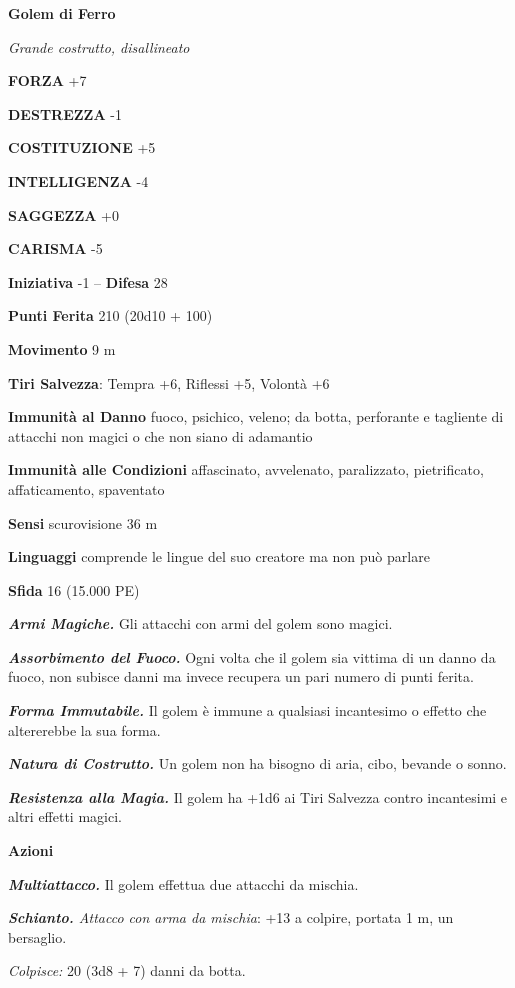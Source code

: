 \begin{multicols}{2}
\medskip{}\textbf{Golem di Ferro}

\emph{Grande costrutto, disallineato}

\textbf{FORZA} +7

\textbf{DESTREZZA} -1

\textbf{COSTITUZIONE} +5

\textbf{INTELLIGENZA} -4

\textbf{SAGGEZZA} +0

\textbf{CARISMA} -5

\textbf{Iniziativa} -1 -- \textbf{Difesa} 28

\textbf{Punti Ferita} 210 (20d10 + 100)

\textbf{Movimento} 9 m

\textbf{Tiri Salvezza}: Tempra +6, Riflessi +5, Volontà +6

\textbf{Immunità al Danno} fuoco, psichico, veleno; da botta, perforante e tagliente di attacchi non magici o che non siano di adamantio

\textbf{Immunità alle Condizioni} affascinato, avvelenato, paralizzato, pietrificato, affaticamento, spaventato

\textbf{Sensi} scurovisione 36 m

\textbf{Linguaggi} comprende le lingue del suo creatore ma non può parlare

\textbf{Sfida} 16 (15.000 PE)

\emph{\textbf{Armi Magiche.}} Gli attacchi con armi del golem sono magici.

\emph{\textbf{Assorbimento del Fuoco.}} Ogni volta che il golem sia vittima di un danno da fuoco, non subisce danni ma invece recupera un pari numero di punti ferita.

\emph{\textbf{Forma Immutabile.}} Il golem è immune a qualsiasi incantesimo o effetto che altererebbe la sua forma.

\emph{\textbf{Natura di Costrutto.}} Un golem non ha bisogno di aria, cibo, bevande o sonno.

\emph{\textbf{Resistenza alla Magia.}} Il golem ha +1d6 ai Tiri Salvezza contro incantesimi e altri effetti magici.

\textbf{Azioni}

\emph{\textbf{Multiattacco.}} Il golem effettua due attacchi da mischia.

\emph{\textbf{Schianto.} Attacco con arma da mischia}: +13 a colpire, portata 1 m, un bersaglio.

\emph{Colpisce:} 20 (3d8 + 7) danni da botta.


\end{multicols}
